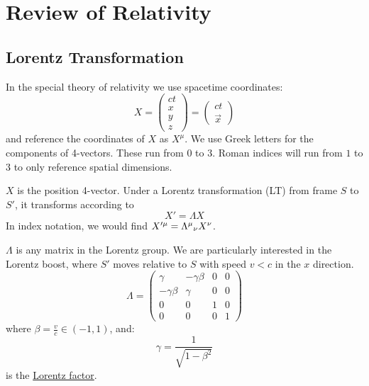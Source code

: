 \documentclass[../Main.tex]{subfiles}
\begin{document}
\section{Review of Relativity}
\subsection{Lorentz Transformation}
In the special theory of relativity we use spacetime coordinates:
\begin{equation*}
    X = \begin{pmatrix}ct \\ x \\ y \\ z\end{pmatrix} = \begin{pmatrix}ct \\ \vec{x}\end{pmatrix}
\end{equation*}
and reference the coordinates of $X$ as $X^\mu$. We use Greek letters for the components of 4-vectors. These run from $0$ to $3$. Roman indices will run from $1$ to $3$ to only reference spatial dimensions.

$X$ is the position 4-vector. Under a Lorentz transformation (LT) from frame $S$ to $S'$, it transforms according to
\begin{equation}
    X' = \Lambda X
    \label{eqnLorentzTransform}
\end{equation}
In index notation, we would find $X^{\prime \mu} = \indx{\Lambda}{\mu}{\nu} X^\nu$.

$\Lambda$ is any matrix in the Lorentz group. We are particularly interested in the Lorentz boost, where $S'$ moves relative to $S$ with speed $v < c$ in the $x$ direction.
\begin{equation*}
    \Lambda =
    \begin{pmatrix}
        \gamma & -\gamma \beta & 0 & 0 \\
        -\gamma\beta & \gamma & 0 & 0 \\
        0 & 0 & 1 & 0 \\
        0 & 0 & 0 & 1
    \end{pmatrix}
\end{equation*}
where $\beta = \frac{v}{c} \in (-1, 1)$, and:
\begin{equation*}
    \gamma = \frac{1}{\sqrt{1 - \beta^2}}
\end{equation*}
is the \underline{Lorentz factor}.
\end{document}
